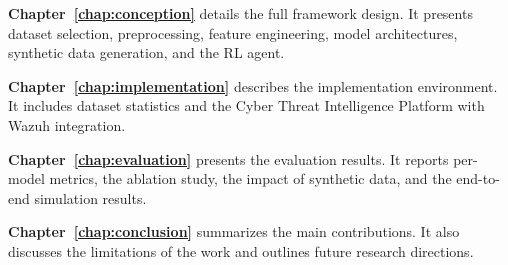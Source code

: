 \documentclass[11pt,a4paper]{report}
\begin{document}
\textbf{Chapter~\ref{chap:conception}} details the full framework design.
It presents dataset selection, preprocessing, feature engineering, model architectures,
synthetic data generation, and the RL agent.

\textbf{Chapter~\ref{chap:implementation}} describes the implementation environment.
It includes dataset statistics and the Cyber Threat Intelligence Platform with Wazuh
integration.

\textbf{Chapter~\ref{chap:evaluation}} presents the evaluation results.
It reports per-model metrics, the ablation study, the impact of synthetic data, and the
end-to-end simulation results.

\textbf{Chapter~\ref{chap:conclusion}} summarizes the main contributions.
It also discusses the limitations of the work and outlines future research directions.

\newpage










\end{document}

